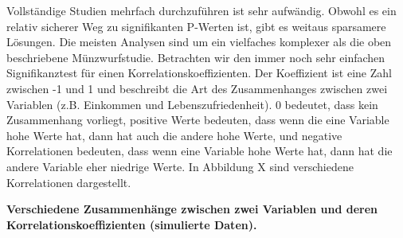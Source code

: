 \documentclass[
  letterpaper,
  DIV=11,
  numbers=noendperiod]{scrreprt}
\begin{document}
Vollständige Studien mehrfach durchzuführen ist sehr aufwändig. Obwohl
es ein relativ sicherer Weg zu signifikanten P-Werten ist, gibt es
weitaus sparsamere Lösungen. Die meisten Analysen sind um ein vielfaches
komplexer als die oben beschriebene Münzwurfstudie. Betrachten wir den
immer noch sehr einfachen Signifikanztest für einen
Korrelationskoeffizienten. Der Koeffizient ist eine Zahl zwischen -1 und
1 und beschreibt die Art des Zusammenhanges zwischen zwei Variablen
(z.B. Einkommen und Lebenszufriedenheit). 0 bedeutet, dass kein
Zusammenhang vorliegt, positive Werte bedeuten, dass wenn die eine
Variable hohe Werte hat, dann hat auch die andere hohe Werte, und
negative Korrelationen bedeuten, dass wenn eine Variable hohe Werte hat,
dann hat die andere Variable eher niedrige Werte. In Abbildung X sind
verschiedene Korrelationen dargestellt.

\textbf{Verschiedene Zusammenhänge zwischen zwei Variablen und deren
Korrelationskoeffizienten (simulierte Daten).}
\end{document}
